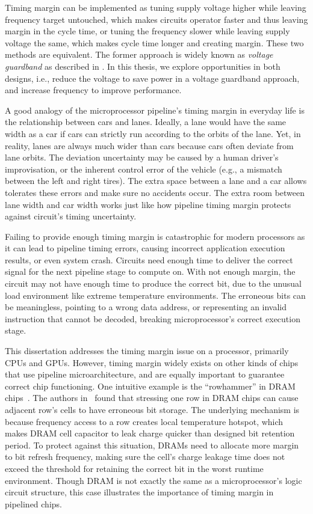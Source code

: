 Timing margin can be implemented as tuning supply voltage higher while leaving frequency target untouched, which makes circuits operator faster and thus leaving margin in the cycle time, or tuning the frequency slower while leaving supply voltage the same, which makes cycle time longer and creating margin. These two methods are equivalent. The former approach is widely known as \textit{voltage guardband} as described in . In this thesis, we explore opportunities in both designs, i.e., reduce the voltage to save power in a voltage guardband approach, and increase frequency to improve performance.

A good analogy of the microprocessor pipeline's timing margin in everyday life is the relationship between cars and lanes. Ideally, a lane would have the same width as a car if cars can strictly run according to the orbits of the lane. Yet, in reality, lanes are always much wider than cars because cars often deviate from lane orbits. The deviation uncertainty may be caused by a human driver's improvisation, or the inherent control error of the vehicle (e.g., a mismatch between the left and right tires). The extra space between a lane and a car allows tolerates these errors and make sure no accidents occur. The extra room between lane width and car width works just like how pipeline timing margin protects against circuit's timing uncertainty.

Failing to provide enough timing margin is catastrophic for modern processors as it can lead to pipeline timing errors, causing incorrect application execution results, or even system crash. Circuits need enough time to deliver the correct signal for the next pipeline stage to compute on. With not enough margin, the circuit may not have enough time to produce the correct bit, due to the unusual load environment like extreme temperature environments. The erroneous bits can be meaningless, pointing to a wrong data address, or representing an invalid instruction that cannot be decoded, breaking microprocessor's correct execution stage.

This dissertation addresses the timing margin issue on a processor, primarily CPUs and GPUs. However, timing margin widely exists on other kinds of chips that use pipeline microarchitecture, and are equally important to guarantee correct chip functioning. One intuitive example is the ``rowhammer'' in DRAM chips~\cite{kim2014flipping}. The authors in~\cite{kim2014flipping} found that stressing one row in DRAM chips can cause adjacent row's cells to have erroneous bit storage. The underlying mechanism is because frequency access to a row creates local temperature hotspot, which makes DRAM cell capacitor to leak charge quicker than designed bit retention period. To protect against this situation, DRAMs need to allocate more margin to bit refresh frequency, making sure the cell's charge leakage time does not exceed the threshold for retaining the correct bit in the worst runtime environment. Though DRAM is not exactly the same as a microprocessor's logic circuit structure, this case illustrates the importance of timing margin in pipelined chips.

